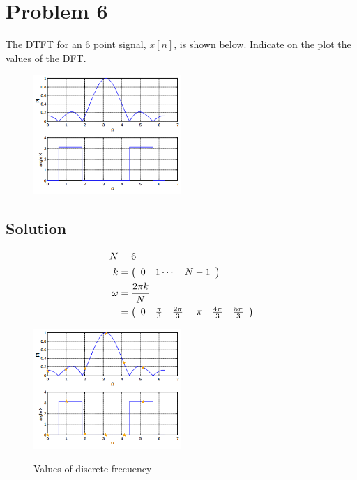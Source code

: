 \section*{Problem 6}

The DTFT for an 6 point signal, $x[n]$, 
is shown below. Indicate on the plot the values of the DFT.

\begin{figure}[H]
\caption*{}
\centering
\includegraphics[width=0.5\textwidth]{figs/c4p6.png}
\label{fig:c4p6}
\end{figure} 

\subsection*{Solution}

\begin{equation*}
\begin{aligned}
N &= 6 \\
k &= \left(
\begin{array}{c c c}
 0& 1\cdots & N-1
 \end{array} \right) \\
\omega &= \frac{2 \pi k}{N} \\ 
	   &= \left(
	   \begin{array}{*6c}
	    0 & \frac{\pi}{3} & \frac{2 \pi}{3}\ &\pi& \frac{4 \pi}{3} &\frac{5 \pi}{3}
		\end{array}
		\right) 
\end{aligned}
\end{equation*} 

\begin{figure}[H]
\caption{Values of discrete frecuency}
\centering
\includegraphics[width=0.5\textwidth]{figs/c4p61.png}
\label{fig:c4p61}
\end{figure} 


